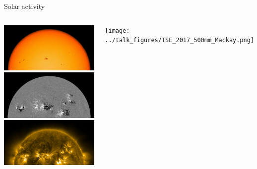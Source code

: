 \begin{frame}[plain,c]{Solar activity}{}
	\begin{columns}[c]
		
		\includegraphics[width=\textwidth]{../talk_figures/20130516_170000_4096_HMIIC_half.jpg}\\
		\includegraphics[width=\textwidth]{../talk_figures/20130516_170000_4096_HMIB_half.jpg}\\
		\pause
		\includegraphics[width=\textwidth]{../talk_figures/20130516_170048_4096_0171_half.jpg}
		\pause
		
		
		\centering
		\texttt{[image: ../talk\_figures/TSE\_2017\_500mm\_Mackay.png]}
		\vfill\hfill \hyperlink{wavelengths}{\beamerskipbutton{}}
	\end{columns}

\end{frame}

